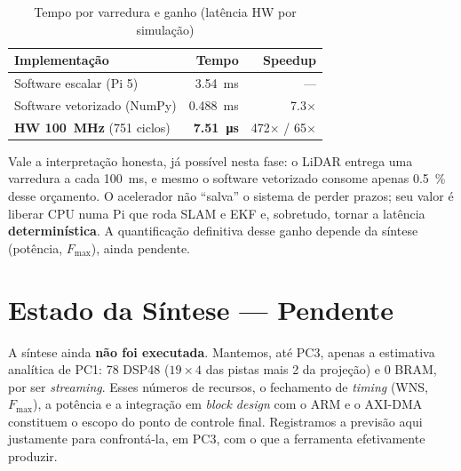 \documentclass[conference]{IEEEtran}
\begin{document}
\begin{table}[!t]
\caption{Tempo por varredura e ganho (lat\^encia HW por simula\c{c}\~ao)}
\label{tab:speedup}
\centering\footnotesize
\begin{tabular}{@{}lrr@{}}
\toprule
\textbf{Implementa\c{c}\~ao} & \textbf{Tempo} & \textbf{Speedup} \\
\midrule
Software escalar (Pi 5)      & \SI{3.54}{\milli\second}   & --- \\
Software vetorizado (NumPy)  & \SI{0.488}{\milli\second}  & \num{7.3}$\times$ \\
\textbf{HW \SI{100}{\mega\hertz}} (\num{751} ciclos) & \textbf{\SI{7.51}{\micro\second}} & \num{472}$\times$ / \num{65}$\times$ \\
\bottomrule
\end{tabular}
\end{table}

Vale a interpreta\c{c}\~ao honesta, j\'a poss\'ivel nesta fase: o LiDAR entrega
uma varredura a cada \SI{100}{\milli\second}, e mesmo o software vetorizado
consome apenas \SI{0.5}{\percent} desse or\c{c}amento. O acelerador n\~ao
``salva'' o sistema de perder prazos; seu valor \'e liberar CPU numa Pi que roda
SLAM e EKF e, sobretudo, tornar a lat\^encia \textbf{determin\'istica}. A
quantifica\c{c}\~ao definitiva desse ganho depende da s\'intese (pot\^encia,
$F_{\max}$), ainda pendente.

\section{Estado da S\'intese --- Pendente}

A s\'intese ainda \textbf{n\~ao foi executada}. Mantemos, at\'e PC3, apenas a
estimativa anal\'itica de PC1: \num{78} DSP48 ($19\times4$ das pistas mais
\num{2} da proje\c{c}\~ao) e \num{0} BRAM, por ser \emph{streaming}. Esses
n\'umeros de recursos, o fechamento de \emph{timing} (WNS, $F_{\max}$), a
pot\^encia e a integra\c{c}\~ao em \emph{block design} com o ARM e o AXI-DMA
constituem o escopo do ponto de controle final. Registramos a previs\~ao aqui
justamente para confront\'a-la, em PC3, com o que a ferramenta efetivamente
produzir.
\end{document}
